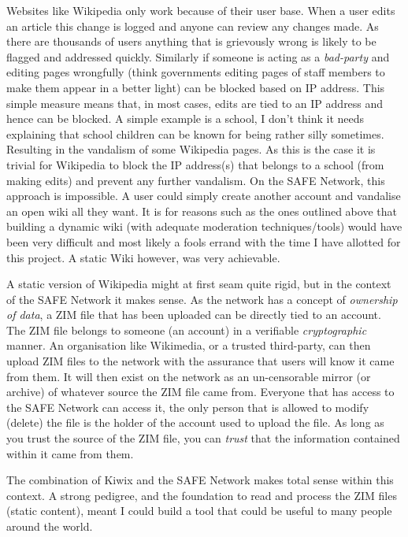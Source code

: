 \documentclass{l4proj}
\begin{document}
Websites like Wikipedia only work because of their user base. When a user edits an article this change is logged and anyone can review any changes made. As there are thousands of users anything that is grievously wrong is likely to be flagged and addressed quickly. Similarly if someone is acting as a \textit{bad-party} and editing pages wrongfully (think governments editing pages of staff members to make them appear in a better light) can be blocked based on IP address. This simple measure means that, in most cases, edits are tied to an IP address and hence can be blocked. A simple example is a school, I don't think it needs explaining that school children can be known for being rather silly sometimes. Resulting in the vandalism of some Wikipedia pages. As this is the case it is trivial for Wikipedia to block the IP address(s) that belongs to a school (from making edits) and prevent any further vandalism. On the SAFE Network, this approach is impossible. A user could simply create another account and vandalise an open wiki all they want. It is for reasons such as the ones outlined above that building a dynamic wiki (with adequate moderation techniques/tools) would have been very difficult and most likely a fools errand with the time I have allotted for this project. A static Wiki however, was very achievable.

A static version of Wikipedia might at first seam quite rigid, but in the context of the SAFE Network it makes sense. As the network has a concept of \textit{ownership of data}, a ZIM file that has been uploaded can be directly tied to an account. The ZIM file belongs to someone (an account) in a verifiable \textit{cryptographic} manner. An organisation like Wikimedia, or a trusted third-party, can then upload ZIM files to the network with the assurance that users will know it came from them. It will then exist on the network as an un-censorable mirror (or archive) of whatever source the ZIM file came from. Everyone that has access to the SAFE Network can access it, the only person that is allowed to modify (delete) the file is the holder of the account used to upload the file. As long as you trust the source of the ZIM file, you can \textit{trust} that the information contained within it came from them.

The combination of Kiwix and the SAFE Network makes total sense within this context. A strong pedigree, and the foundation to read and process the ZIM files (static content), meant I could build a tool that could be useful to many people around the world.
\end{document}
